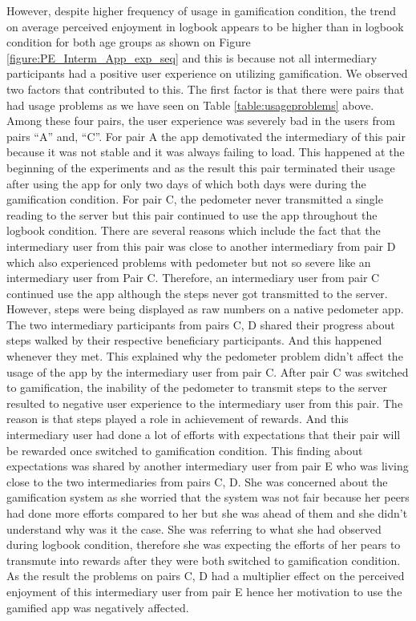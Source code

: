 \documentclass{sig-alternate}
\begin{document}
However, despite higher frequency of usage in gamification condition, the trend on average perceived enjoyment in logbook appears to be higher than in logbook condition for both age groups as shown on Figure \ref{figure:PE_Interm_App_exp_seq} and this is because not all intermediary participants had a positive user experience on utilizing gamification. We observed two factors that contributed  to this. The first factor is that there were pairs that had usage problems as we have seen on Table \ref{table:usageproblems} above. Among these four pairs, the user experience was severely bad in the users from pairs ``A'' and, ``C''.\newline
For pair A the app demotivated the intermediary of this pair because it was not stable  and it was always failing to load. This happened at the beginning of the experiments and as the result this pair terminated their usage after using the app for only two days of which both days were during the gamification condition.\newline
For pair C, the pedometer never transmitted a single reading to the server but this pair continued to use the app throughout the logbook condition. There are several reasons which include the fact that the intermediary user from this pair was close to another intermediary from pair D which also experienced problems with pedometer but not so severe like an intermediary user from Pair C. Therefore, an intermediary user from pair C continued use the app although the steps never got transmitted to the server. However, steps were being displayed as raw numbers on a native pedometer app. The two intermediary participants from pairs C, D shared their progress about steps walked by their respective beneficiary participants. And this happened whenever they met.  This explained why the pedometer problem didn't affect the usage of the app by the intermediary user from pair C. After pair C was switched to gamification, the inability of the pedometer to transmit steps to the server resulted to negative user experience to the intermediary user from this pair. The reason is that steps played a role in achievement of rewards. And this intermediary user had done a lot of efforts with expectations that their pair will be rewarded once switched to gamification condition. This finding about expectations was shared by another intermediary user from pair E who was living close  to the two intermediaries from pairs C, D. She was concerned about the gamification system as she worried that the system was not fair because her peers had done more efforts compared to her but she was ahead of them and she didn't understand why was it the case. She was referring to what she had observed during logbook condition,  therefore she was expecting the efforts of her pears to transmute into rewards after they were both switched to gamification condition.  As the result the problems on pairs C, D had a multiplier  effect on the perceived enjoyment of this intermediary user from pair E hence her motivation to use the gamified app was negatively affected.\newline 
\end{document}
